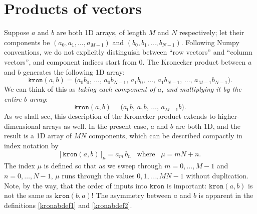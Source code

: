\documentclass[pra,12pt]{revtex4}
\begin{document}
\section{Products of vectors}

Suppose $a$ and $b$ are both 1D arrays, of length $M$ and $N$
respectively; let their components be $(a_0, a_1, \dots, a_{M-1})$ and
$(b_0, b_1, \dots, b_{N-1})$.  Following Numpy conventions, we do not
explicitly distinguish between ``row vectors'' and ``column vectors'',
and component indices start from 0.  The Kronecker product between $a$
and $b$ generates the following 1D array:
\begin{equation}
  \texttt{kron}(a, b) = \Big(a_0b_0,\,\dots,\, a_0 b_{N-1},\, a_1 b_0,\, \dots,\, a_1 b_{N-1},\, \dots,\, a_{M-1}b_{N-1}\Big).\label{kronabdef1}
\end{equation}
We can think of this as \textit{taking each component of $a$, and
  multiplying it by the entire $b$ array}:
\begin{equation}
  \texttt{kron}(a, b) = \Big(a_0b,\, a_1 b,\, \dots,\, a_{M-1}b\Big).
  \label{kronabdef2}
\end{equation}
As we shall see, this description of the Kronecker product extends to
higher-dimensional arrays as well.  In the present case, $a$ and $b$
are both 1D, and the result is a 1D array of $MN$ components, which
can be described compactly in index notation by
\begin{equation}
  \big[\, \texttt{kron}(a, b) \,\big]_{\mu} = a_m \, b_n \;\;\;\mathrm{where}\;\;\;\mu = mN+n.
  \label{kronab}
\end{equation}
The index $\mu$ is defined so that as we sweep through $m =
0,\dots,M-1$ and $n = 0,\dots,N-1$, $\mu$ runs through the values
$0,1,\dots,MN-1$ without duplication.  Note, by the way, that the
order of inputs into $\texttt{kron}$ is important:
$\texttt{kron}(a,b)$ is not the same as $\texttt{kron}(b,a)$!  The
asymmetry between $a$ and $b$ is apparent in the definitions
\eqref{kronabdef1} and \eqref{kronabdef2}.
\end{document}

